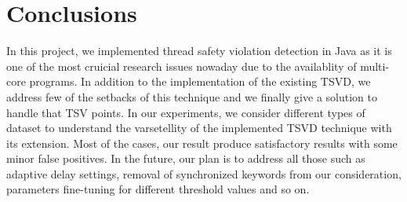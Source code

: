 \section{Conclusions}
\label{sec:conclusion}
In this project, we implemented thread safety violation detection in Java as it
is one of the most cruicial research issues nowaday due to the availablity of
multi-core programs. In addition to the implementation of the existing TSVD, we address few of the
setbacks of this technique and we finally give a solution to handle that TSV points. In our experiments, we consider different types of dataset to understand the varsetellity of the implemented TSVD technique with its extension. Most of the cases, our result produce satisfactory results with some minor false positives. In the future, our plan is to address all those such as adaptive delay settings, removal of synchronized keywords from our consideration, parameters fine-tuning for different threshold values and so on.  

